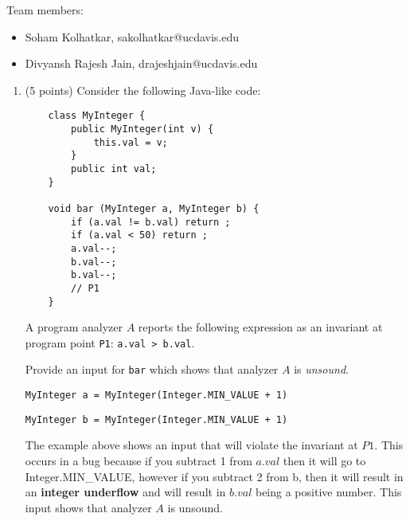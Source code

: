 \documentclass[12pt]{article}
\begin{document}
    \begin{mdframed}
      Team members:
      \begin{itemize}
        \item Soham Kolhatkar, sakolhatkar@ucdavis.edu %
        \item Divyansh Rajesh Jain, drajeshjain@ucdavis.edu %
      \end{itemize}
    \end{mdframed}

    
    \newpage
    \begin{enumerate}

    

\item (5 points) Consider the following Java-like code:
  \begin{lstlisting}
    class MyInteger {
        public MyInteger(int v) {
            this.val = v;
        }
        public int val;
    }

    void bar (MyInteger a, MyInteger b) {
        if (a.val != b.val) return ;
        if (a.val < 50) return ;
        a.val--;
        b.val--;
        b.val--;
        // P1
    }
  \end{lstlisting}
  A program analyzer $A$
  reports the following expression as an invariant 
  at program point \lstinline$P1$: \lstinline$a.val > b.val$.

  Provide an input for \lstinline$bar$ which shows that analyzer $A$ is \emph{unsound}.
    \begin{mdframed}
        \lstinline$MyInteger a = MyInteger(Integer.MIN_VALUE + 1)  $
        
        \lstinline$MyInteger b = MyInteger(Integer.MIN_VALUE + 1) $

    
        The example above shows an input that will violate the invariant at $P1$. This occurs in a bug because if you subtract 1 from $a.val$ then it will go to Integer.MIN\_VALUE, however if you subtract 2 from b, then it will result in an \textbf{integer underflow} and will result in $b.val$ being a positive number. This input shows that analyzer $A$ is unsound.
        
    \end{mdframed}


\end{enumerate}
\end{document}
